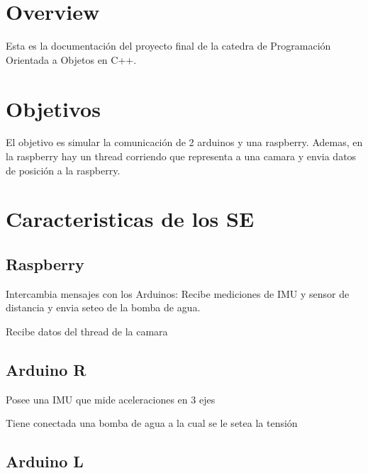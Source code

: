 \hypertarget{index_autotoc_md0}{}\section{Overview}\label{index_autotoc_md0}
Esta es la documentación del proyecto final de la catedra de Programación Orientada a Objetos en C++.\hypertarget{index_autotoc_md1}{}\section{Objetivos}\label{index_autotoc_md1}


El objetivo es simular la comunicación de 2 arduinos y una raspberry. Ademas, en la raspberry hay un thread corriendo que representa a una camara y envia datos de posición a la raspberry.\hypertarget{index_autotoc_md2}{}\section{Caracteristicas de los SE}\label{index_autotoc_md2}
\hypertarget{index_autotoc_md3}{}\subsection{Raspberry}\label{index_autotoc_md3}

\begin{DoxyItemize}
\item Intercambia mensajes con los Arduinos\+: Recibe mediciones de I\+MU y sensor de distancia y envia seteo de la bomba de agua.
\item Recibe datos del thread de la camara
\end{DoxyItemize}\hypertarget{index_autotoc_md4}{}\subsection{Arduino R}\label{index_autotoc_md4}

\begin{DoxyItemize}
\item Posee una I\+MU que mide aceleraciones en 3 ejes
\item Tiene conectada una bomba de agua a la cual se le setea la tensión
\end{DoxyItemize}\hypertarget{index_autotoc_md5}{}\subsection{Arduino L}\label{index_autotoc_md5}

